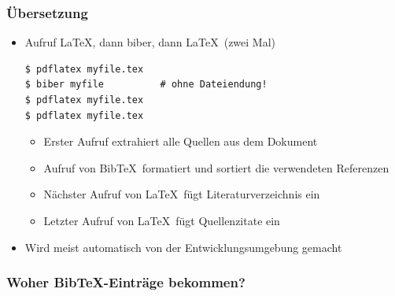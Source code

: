 \begin{frame}[fragile]
  \frametitle{Übersetzung}
  \begin{itemize}
    \item<+-> Aufruf \LaTeX, dann biber, dann \LaTeX\ (zwei Mal)
    \onslide<+->
\begin{verbatim}
$ pdflatex myfile.tex
$ biber myfile          # ohne Dateiendung! 
$ pdflatex myfile.tex
$ pdflatex myfile.tex
\end{verbatim}
    \begin{itemize}
    \item<+-> Erster Aufruf extrahiert alle Quellen aus dem Dokument
    \item<+-> Aufruf von Bib\TeX\ formatiert und sortiert die
      verwendeten Referenzen
    \item<+-> Nächster Aufruf von \LaTeX\ fügt Literaturverzeichnis ein
    \item<+-> Letzter Aufruf von \LaTeX\ fügt Quellenzitate ein
    \end{itemize}
  \item<+-> Wird meist automatisch von der Entwicklungsumgebung gemacht
  \end{itemize}

\end{frame}

\begin{frame}[fragile]
  \frametitle{Woher Bib\TeX-Einträge bekommen?}

  \centering


\end{frame}


